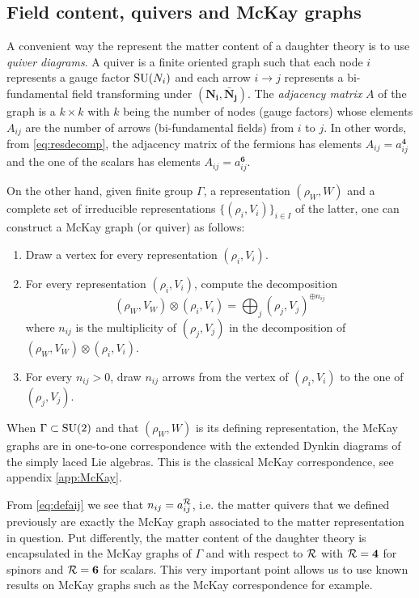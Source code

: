     \subsection{Field content, quivers and McKay graphs}

        A convenient way the represent the matter content of a daughter theory is to use \emph{quiver diagrams}. A quiver is a finite oriented graph such that each node $i$ represents a gauge factor $\text{SU}(N_i)$ and each arrow $i\to j$ represents a bi-fundamental field transforming under $(\boldsymbol{\textbf{N}_i},\boldsymbol{\bar{\textbf{N}}_j})$. The \emph{adjacency matrix} $A$ of the graph is a $k\times k$ with $k$ being the number of nodes (gauge factors) whose elements $A_{ij}$ are the number of arrows (bi-fundamental fields) from $i$ to $j$. In other words, from \eqref{eq:resdecomp}, the adjacency matrix of the fermions has elements $A_{ij}=a^{\boldsymbol{4}}_{ij}$ and the one of the scalars has elements $A_{ij}=a^{\boldsymbol{6}}_{ij}$.

        On the other hand, given finite group $\Gamma$, a representation $(\rho_W,W)$ and a complete set of irreducible representations $\{(\rho_i,V_i)\}_{i\in I}$ of the latter, one can construct a McKay graph (or quiver) as follows:
        \begin{enumerate}
            \item Draw a vertex for every representation $(\rho_i,V_i)$.
            \item For every representation $(\rho_i,V_i)$, compute the decomposition
            \begin{equation*}
                (\rho_W,V_W)\otimes(\rho_i,V_i)=\bigoplus_j (\rho_j,V_j)^{\oplus n_{ij}}
            \end{equation*}
            where $n_{ij}$ is the multiplicity of $(\rho_j,V_j)$ in the decomposition of $(\rho_W,V_W)\otimes(\rho_i,V_i)$.
            \item For every $n_{ij}>0$, draw $n_{ij}$ arrows from the vertex of $(\rho_i,V_i)$ to the one of $(\rho_j,V_j)$.
        \end{enumerate}
        When $\Gamma\subset\text{SU}(2)$ and that $(\rho_W,W)$ is its defining representation, the McKay graphs are in one-to-one correspondence with the extended Dynkin diagrams of the simply laced Lie algebras. This is the classical McKay correspondence, see appendix \ref{app:McKay}.
        
        From \eqref{eq:defaij} we see that $n_{ij}=a^{\mathcal{R}}_{ij}$, i.e. the matter quivers that we defined previously are exactly the McKay graph associated to the matter representation in question. Put differently, the matter content of the daughter theory is encapsulated in the McKay graphs of $\Gamma$ and with respect to $\mathcal{R}$ with $\mathcal{R}=\boldsymbol{4}$ for spinors and $\mathcal{R}=\boldsymbol{6}$ for scalars. This very important point allows us to use known results on McKay graphs such as the McKay correspondence for example.

